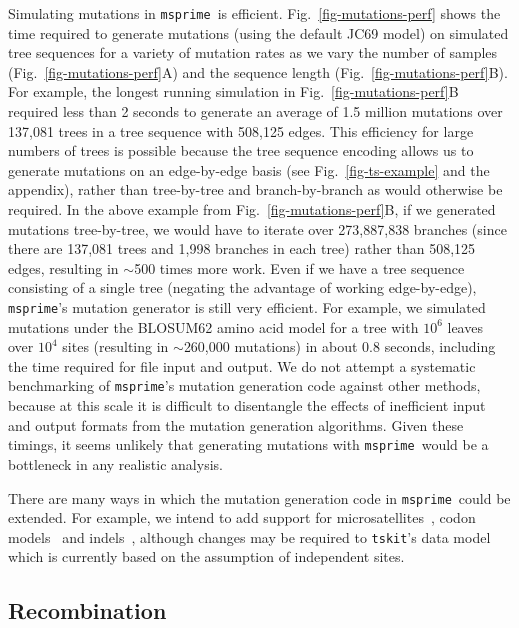 \documentclass{article}
\newcommand{\msprime}[0]{\texttt{msprime}}
\newcommand{\tskit}[0]{\texttt{tskit}}
\begin{document}
Simulating mutations in \msprime\ is efficient.
Fig.~\ref{fig-mutations-perf} shows the time required to generate
mutations (using the default JC69 model) on
simulated tree sequences for a variety of mutation
rates as we vary the number of samples
(Fig.~\ref{fig-mutations-perf}A) and the sequence
length (Fig.~\ref{fig-mutations-perf}B).
For example, the longest running simulation in
Fig.~\ref{fig-mutations-perf}B required less than 2 seconds to
generate an average of 1.5 million mutations over 137,081 trees
in a tree sequence with 508,125 edges.
This efficiency for large numbers of trees is possible because
the tree sequence encoding allows us to generate mutations
on an edge-by-edge basis
(see Fig.~\ref{fig-ts-example} and the~
appendix),
rather than tree-by-tree and branch-by-branch as would otherwise be required.
In the above example from Fig.~\ref{fig-mutations-perf}B,
if we generated mutations tree-by-tree, we would have to iterate over 273,887,838 branches
(since there are 137,081 trees and 1,998 branches in each
tree) rather than 508,125 edges, resulting in $\sim$500 times more work.
Even if we have a tree sequence consisting of a single tree
(negating the advantage of working edge-by-edge),
\msprime's mutation generator is still very efficient.
For example, we simulated mutations under the BLOSUM62 amino
acid model for a tree with $10^6$ leaves over $10^4$ sites (resulting
in $\sim$260,000 mutations) in about $0.8$ seconds, including
the time required for file input and output.
We do not attempt a systematic benchmarking of \msprime's
mutation generation code against other methods, because at this scale it is
difficult to disentangle the effects of inefficient input and
output formats from the mutation generation algorithms.
Given these timings, it seems unlikely
that generating mutations with \msprime\ would be a bottleneck in any
realistic analysis.

There are many ways in which the mutation generation code
in \msprime\ could be extended. For example, we intend to add support for
microsatellites~\citep{mailund2005coasim},
codon models~\citep{arenas2007recodon}
and indels~\citep{cartwright2005dna,fletcher2009indelible},
although changes may be required to \tskit's data model
which is currently based on the assumption of independent sites.

\subsection*{Recombination}
\label{sec-recombination}
\end{document}
